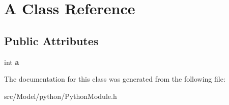 \hypertarget{classA}{}\section{A Class Reference}
\label{classA}
\subsection*{Public Attributes}
\begin{DoxyCompactItemize}
\item 
int {\bfseries a}\hypertarget{classA_a49a53415abd8f1b26235579cc805a15f}{}\label{classA_a49a53415abd8f1b26235579cc805a15f}

\end{DoxyCompactItemize}


The documentation for this class was generated from the following file\+:\begin{DoxyCompactItemize}
\item 
src/\+Model/python/Python\+Module.\+h\end{DoxyCompactItemize}
